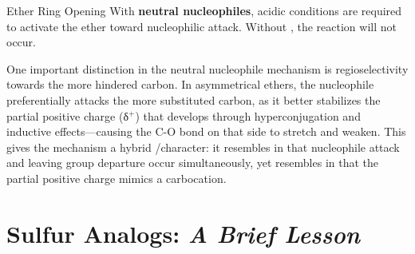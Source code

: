 \documentclass[10pt]{article}
\begin{document}
\begin{core}{Ether Ring Opening}
    With \textbf{neutral nucleophiles}, acidic conditions are required to activate the ether toward nucleophilic attack. Without , the reaction will not occur.

    
    One important distinction in the neutral nucleophile mechanism is regioselectivity towards the more hindered carbon. In asymmetrical ethers, the nucleophile preferentially attacks the more substituted carbon, as it better stabilizes the partial positive charge (δ$^+$) that develops through hyperconjugation and inductive effects---causing the C-O bond on that side to stretch and weaken. This gives the mechanism a hybrid \sno/\snt character: it resembles \snt in that nucleophile attack and leaving group departure occur simultaneously, yet resembles \sno in that the partial positive charge mimics a carbocation.


  \end{core}

\section{Sulfur Analogs: \textit{A Brief Lesson}}
\end{document}
